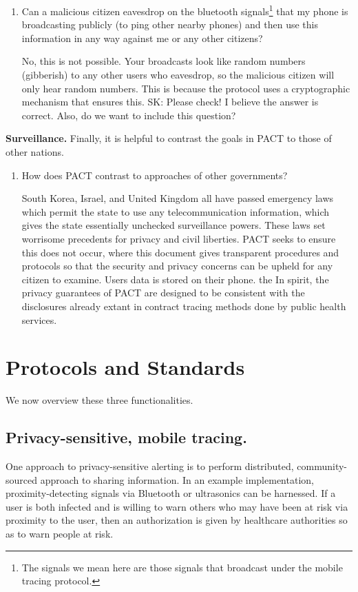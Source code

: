 \documentclass{article}
\newcommand{\TODO}[1]{ {\color{blue} #1 }}
\begin{document}
\begin{enumerate}[leftmargin=*]
\item Can a malicious citizen eavesdrop on the bluetooth signals\footnote{The signals we mean here are those signals that broadcast under the mobile tracing protocol.} that my phone is broadcasting publicly (to ping other nearby phones) and then use this information in any way against me or any other citizens?

   No, this is not possible. Your broadcasts look like random numbers (gibberish) to any other users who eavesdrop, so the malicious citizen will only hear random numbers. This is because the protocol uses a cryptographic mechanism that ensures this.  \TODO{SK: Please check! I believe the answer is correct. Also, do we want to include this question?} 

\end{enumerate}



\textbf{Surveillance.} Finally, it is helpful to contrast the goals in PACT to those of other nations.

\begin{enumerate}[leftmargin=*]
\item How does PACT contrast to approaches of other governments?

South Korea, Israel, and United Kingdom all have passed emergency laws which permit the state to use any telecommunication information, which gives the state essentially unchecked surveillance powers. These laws set worrisome precedents for privacy and civil liberties. PACT seeks to ensure this does not occur, where this document gives transparent procedures and protocols so that the security and privacy concerns can be upheld for any citizen to examine. Users data is stored on their phone. the In spirit, the privacy guarantees of PACT are designed to be consistent with the disclosures already extant in contract tracing methods done by public health services. 

\end{enumerate}

\section{Protocols and Standards} 
We now overview these three functionalities.


\subsection{Privacy-sensitive, mobile tracing.} 
One approach to privacy-sensitive alerting is to perform distributed, community-sourced approach to sharing information. In an example implementation, proximity-detecting signals via Bluetooth or ultrasonics can be harnessed.  If a user is both infected and is willing to warn others who may have been at risk via proximity to the user, then an authorization is given by healthcare authorities so as to warn people at risk.
\end{document}
